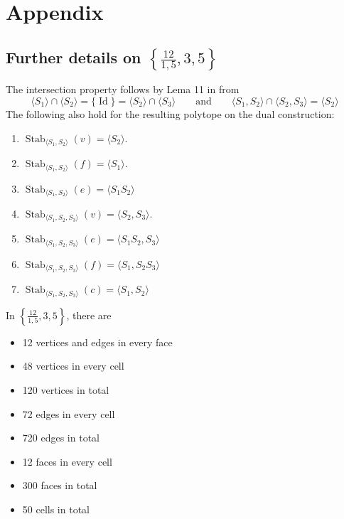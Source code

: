 \documentclass[spanish]{article}
\theoremstyle{definition}
\DeclareMathOperator{\Id}{Id}
\DeclareMathOperator{\Stab}{Stab}
\begin{document}
\clearpage
\section{Appendix}
\subsection{Further details on $\left\{\frac{12}{1,5},3,5\right\}$}
The intersection property follows by Lema 11 in \cite{schulte-chiral} from
\[\langle S_1\rangle\cap\langle S_2\rangle=\{\Id\}=\langle S_2\rangle\cap\langle S_3\rangle\qquad\text{and}\qquad \langle S_1,S_2\rangle\cap\langle S_2,S_3\rangle=\langle S_2\rangle\]
The following also hold for the resulting polytope on the dual construction:
\begin{enumerate}
	\item $\Stab_{\langle S_1,S_2\rangle}(v)=\langle S_2\rangle$.
	\item $\Stab_{\langle S_1,S_2\rangle}(f)=\langle S_1\rangle$.
	\item $\Stab_{\langle S_1,S_2\rangle}(e)=\langle S_1S_2\rangle$
	\item $\Stab_{\langle S_1,S_2,S_3\rangle}(v)=\langle S_2,S_3\rangle$.
	\item $\Stab_{\langle S_1,S_2,S_3\rangle}(e)=\langle S_1S_2,S_3\rangle$
	\item $\Stab_{\langle S_1,S_2,S_3\rangle}(f)=\langle S_1,S_2S_3\rangle$
	\item $\Stab_{\langle S_1,S_2,S_3\rangle}(c)=\langle S_1,S_2\rangle$
\end{enumerate}
In $\left\{\frac{12}{1,5},3,5\right\}$, there are
\begin{itemize}
	\item 12 vertices and edges in every face
	\item 48 vertices in every cell
	\item 120 vertices in total
	\item 72 edges in every cell
	\item 720 edges in total
	\item 12 faces in every cell
	\item 300 faces in total
	\item 50 cells in total
\end{itemize}
\end{document}
